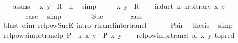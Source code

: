 \begin{isabellebody}
\ \ \isamarkupfalse%
\ assms\ \isamarkupfalse%
\ {\isachardoublequoteopen}{\isacharparenleft}{\kern0pt}x{\isacharcomma}{\kern0pt}\ y{\isacharparenright}{\kern0pt}\ {\isasymin}\ R\ {\isacharcircum}{\kern0pt}{\isacharcircum}{\kern0pt}\ n{\isachardoublequoteclose}\ \isamarkupfalse%
\ simp\isanewline
\ \ \isamarkupfalse%
\ \isamarkupfalse%
\ {\isachardoublequoteopen}{\isacharparenleft}{\kern0pt}x{\isacharcomma}{\kern0pt}\ y{\isacharparenright}{\kern0pt}\ {\isasymin}\ R\isactrlsup {\isacharasterisk}{\kern0pt}{\isachardoublequoteclose}\isanewline
\ \ \isamarkupfalse%
\ {\isacharparenleft}{\kern0pt}induct\ n\ arbitrary{\isacharcolon}{\kern0pt}\ x\ y{\isacharparenright}{\kern0pt}\isanewline
\ \ \ \ \isamarkupfalse%
\ {}\isanewline
\ \ \ \ \isamarkupfalse%
\ \isamarkupfalse%
\ {\isacharquery}{\kern0pt}case\ \isamarkupfalse%
\ simp\isanewline
\ \ \isamarkupfalse%
\isanewline
\ \ \ \ \isamarkupfalse%
\ Suc\isanewline
\ \ \ \ \isamarkupfalse%
\ \isamarkupfalse%
\ {\isacharquery}{\kern0pt}case\isanewline
\ \ \ \ \ \ \isamarkupfalse%
\ {\isacharparenleft}{\kern0pt}blast\ elim{\isacharcolon}{\kern0pt}\ relpow{\isacharunderscore}{\kern0pt}Suc{\isacharunderscore}{\kern0pt}E\ intro{\isacharcolon}{\kern0pt}\ rtrancl{\isacharunderscore}{\kern0pt}into{\isacharunderscore}{\kern0pt}rtrancl{\isacharparenright}{\kern0pt}\isanewline
\ \ \isamarkupfalse%
\isanewline
\ \ \isamarkupfalse%
\ Pair\ \isamarkupfalse%
\ {\isacharquery}{\kern0pt}thesis\ \isamarkupfalse%
\ simp\isanewline
{}\isamarkupfalse%
%
\endisatagproof
{\isafoldproof}%
%
\isadelimproof
\isanewline
%
\endisadelimproof
\isanewline
{}\isamarkupfalse%
\ relpowp{\isacharunderscore}{\kern0pt}imp{\isacharunderscore}{\kern0pt}rtranclp{\isacharcolon}{\kern0pt}\ {\isachardoublequoteopen}{\isacharparenleft}{\kern0pt}P\ {\isacharcircum}{\kern0pt}{\isacharcircum}{\kern0pt}\ n{\isacharparenright}{\kern0pt}\ x\ y\ {\isasymLongrightarrow}\ {\isacharparenleft}{\kern0pt}P\isactrlsup {\isacharasterisk}{\kern0pt}\isactrlsup {\isacharasterisk}{\kern0pt}{\isacharparenright}{\kern0pt}\ x\ y{\isachardoublequoteclose}\isanewline
%
\isadelimproof
\ \ %
\endisadelimproof
%
\isatagproof
{}\isamarkupfalse%
\ relpow{\isacharunderscore}{\kern0pt}imp{\isacharunderscore}{\kern0pt}rtrancl\ {\isacharbrackleft}{\kern0pt}of\ {\isachardoublequoteopen}{\isacharparenleft}{\kern0pt}x{\isacharcomma}{\kern0pt}\ y{\isacharparenright}{\kern0pt}{\isachardoublequoteclose}{\isacharcomma}{\kern0pt}\ to{\isacharunderscore}{\kern0pt}pred{\isacharbrackright}{\kern0pt}\ \isamarkupfalse%

\end{isabellebody}

